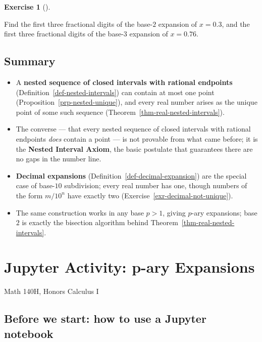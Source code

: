 \documentclass[
  letterpaper,
  DIV=11,
  numbers=noendperiod]{scrreprt}
\providecommand{\tightlist}{%
  \setlength{\itemsep}{0pt}\setlength{\parskip}{0pt}}
\theoremstyle{plain}
\theoremstyle{plain}
\theoremstyle{definition}
\theoremstyle{definition}
\newtheorem{exercise}{Exercise}[chapter]
\theoremstyle{definition}
\theoremstyle{plain}
\theoremstyle{plain}
\theoremstyle{remark}
\begin{document}
\begin{exercise}[]\protect\hypertarget{exr-other-base-expansions}{}\label{exr-other-base-expansions}

Find the first three fractional digits of the base-\(2\) expansion of
\(x=0.3\), and the first three fractional digits of the base-\(3\)
expansion of \(x=0.76\).

\end{exercise}

\section{Summary}\label{summary-1}

\begin{itemize}
\tightlist
\item
  A \textbf{nested sequence of closed intervals with rational endpoints}
  (Definition~\ref{def-nested-intervals}) can contain at most one point
  (Proposition~\ref{prp-nested-unique}), and every real number arises as
  the unique point of some such sequence
  (Theorem~\ref{thm-real-nested-intervals}).
\item
  The converse --- that every nested sequence of closed intervals with
  rational endpoints \emph{does} contain a point --- is not provable
  from what came before; it is the \textbf{Nested Interval Axiom}, the
  basic postulate that guarantees there are no gaps in the number line.
\item
  \textbf{Decimal expansions} (Definition~\ref{def-decimal-expansion})
  are the special case of base-\(10\) subdivision; every real number has
  one, though numbers of the form \(m/10^n\) have exactly two
  (Exercise~\ref{exr-decimal-not-unique}).
\item
  The same construction works in any base \(p>1\), giving \(p\)-ary
  expansions; base \(2\) is exactly the bisection algorithm behind
  Theorem~\ref{thm-real-nested-intervals}.
\end{itemize}

\chapter{Jupyter Activity: p-ary
Expansions}\label{jupyter-activity-p-ary-expansions}

Math 140H, Honors Calculus I

\section{Before we start: how to use a Jupyter
notebook}\label{before-we-start-how-to-use-a-jupyter-notebook}
\end{document}

